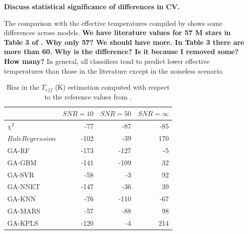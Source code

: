 {\bf Discuss statistical significance of differences in CV.}


The comparison with the effective temperatures compiled by
\cite{cesetti} shows some differences across models. {\bf We have
  literature values for 57 M stars in Table 3 of \cite{cesetti}. Why
  only 57? We should have more. In Table 3 there are more than 60. Why
  is the difference? Is it because I removed some? How many?} In
general, all classifiers tend to predict lower effective temperatures
than those in the literature except in the noiseless scenario.

\begin{table}\centering
{}
\begin{tabular}{@{}lrrr@{}}\toprule
& {$SNR = 10$} & {$SNR = 50$} & {$SNR = \infty$}\\ \midrule
$\chi^2 $            &  -77 &  -87  & -85 \\
$Rule Regression$    & -102 &  -39  & 170 \\
GA-RF                & -173 & -127  &  -5 \\
GA-GBM               & -141 & -109  &  32 \\
GA-SVR               &  -58  &  -3  &  92 \\
GA-NNET              & -147 &  -36  &  39 \\
GA-KNN               &  -76  &-110  & -67 \\
GA-MARS              &  -57  & -88  &  98 \\
GA-KPLS              & -120 &   -4  & 214 \\
\bottomrule
\end{tabular}
\caption {Bias in the $T_{eff}$ (K) estimation computed with respect
  to the reference values from \cite{cesetti}.}
\label{tab:model_Tbias} 
\end{table}

